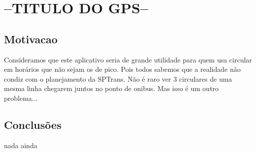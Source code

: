 \section{--TITULO DO GPS--}

\subsection{Motivacao}
Consideramos que este aplicativo seria de grande utilidade para quem usa
circular em horários que não sejam os de pico. Pois todos sabemos que a
realidade não condiz com o planejamento da SPTrans. Não é raro ver
3 circulares de uma mesma linha chegarem juntos no ponto de onibus. Mas
isso é um outro problema...

\subsection{Conclusões}
nada ainda


